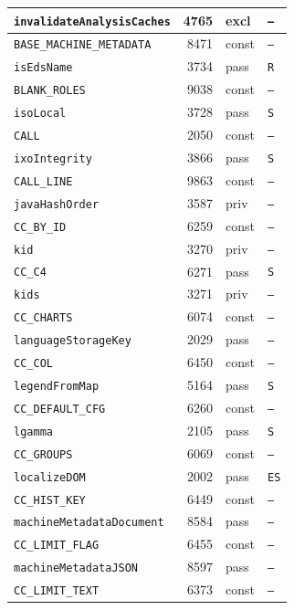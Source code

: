 {\begin{xltabular}{\linewidth}{|l|r|X|X|}
\texttt{invalidateAnalysisCaches} & 4765 & excl & \texttt{--} \\ \hline
\texttt{BASE\_MACHINE\_METADATA} & 8471 & const & \texttt{--} \\ \hline
\texttt{isEdsName} & 3734 & pass & \texttt{R} \\ \hline
\texttt{BLANK\_ROLES} & 9038 & const & \texttt{--} \\ \hline
\texttt{isoLocal} & 3728 & pass & \texttt{S} \\ \hline
\texttt{CALL} & 2050 & const & \texttt{--} \\ \hline
\texttt{ixoIntegrity} & 3866 & pass & \texttt{S} \\ \hline
\texttt{CALL\_LINE} & 9863 & const & \texttt{--} \\ \hline
\texttt{javaHashOrder} & 3587 & priv & \texttt{--} \\ \hline
\texttt{CC\_BY\_ID} & 6259 & const & \texttt{--} \\ \hline
\texttt{kid} & 3270 & priv & \texttt{--} \\ \hline
\texttt{CC\_C4} & 6271 & pass & \texttt{S} \\ \hline
\texttt{kids} & 3271 & priv & \texttt{--} \\ \hline
\texttt{CC\_CHARTS} & 6074 & const & \texttt{--} \\ \hline
\texttt{languageStorageKey} & 2029 & pass & \texttt{--} \\ \hline
\texttt{CC\_COL} & 6450 & const & \texttt{--} \\ \hline
\texttt{legendFromMap} & 5164 & pass & \texttt{S} \\ \hline
\texttt{CC\_DEFAULT\_CFG} & 6260 & const & \texttt{--} \\ \hline
\texttt{lgamma} & 2105 & pass & \texttt{S} \\ \hline
\texttt{CC\_GROUPS} & 6069 & const & \texttt{--} \\ \hline
\texttt{localizeDOM} & 2002 & pass & \texttt{ES} \\ \hline
\texttt{CC\_HIST\_KEY} & 6449 & const & \texttt{--} \\ \hline
\texttt{machineMetadataDocument} & 8584 & pass & \texttt{--} \\ \hline
\texttt{CC\_LIMIT\_FLAG} & 6455 & const & \texttt{--} \\ \hline
\texttt{machineMetadataJSON} & 8597 & pass & \texttt{--} \\ \hline
\texttt{CC\_LIMIT\_TEXT} & 6373 & const & \texttt{--} \\ \hline

\end{xltabular}}
